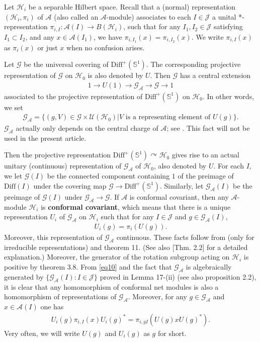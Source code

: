 \documentclass[12pt,a4paper]{article}
\theoremstyle{definition}
\theoremstyle{plain}
\newcommand{\mc}{\mathcal}
\newcommand{\Diffp}{\mathrm{Diff}^+}
\newcommand{\Diff}{\mathrm{Diff}}
\newcommand{\GA}{\mathscr G_{\mathcal A}}
\newcommand{\scr}{\mathscr}
\newcommand{\mbb}{\mathbb}
\numberwithin{equation}{section}
\begin{document}
Let $\mathcal H_i$ be a separable Hilbert space. Recall that a (normal) representation $(\mathcal H_i,\pi_i)$ of $\mathcal A$ (also called an $\mc A$-module) associates to each $I\in\mathcal J$ a unital *-representation $\pi_{i,I}:\mathcal A(I)\rightarrow B(\mathcal H_i)$, such that for any $I_1,I_2\in\mathcal J$ satisfying $I_1\subset I_2$, and any $x\in\mathcal A(I_1)$, we have $\pi_{i,I_1}(x)=\pi_{i,I_2}(x)$. We write $\pi_{i,I}(x)$  as $\pi_i(x)$ or just $x$ when no confusion arises. 



Let $\scr G$ be the universal covering of $\Diffp(\mbb S^1)$. The corresponding projective representation of $\scr G$ on $\mc H_0$ is also denoted by $U$. Then $\scr G$ has a central extension
\begin{align*}
1\rightarrow U(1)\rightarrow\GA\rightarrow \scr G\rightarrow 1
\end{align*}
associated to the projective representation of $\Diffp(\mbb S^1)$ on $\mc H_0$. In other words, we set
\begin{align*}
\GA=\{(g,V)\in\mathscr G\times \mathcal U(\mathcal H_0)| V \textrm{ is a representing element of } U(g) \}.
\end{align*}
$\scr G_{\mc A}$ actually only depends on the central charge of $\scr A$; see \cite{Gui21a}. This fact will not be used in the present article.

Then the projective representation $\Diffp(\mbb S^1)\curvearrowright\mc H_0$ gives rise to an actual unitary (continuous) representation of $\GA$ of $\mc H_0$, also denoted by $U$. For each $I$, we let $\scr G(I)$ be the connected component containing $1$ of the preimage of $\Diff(I)$ under the covering map $\scr G\rightarrow \Diffp(\mbb S^1)$. Similarly, let $\GA(I)$ be the preimage of $\scr G(I)$ under $\GA\rightarrow\scr G$. If $\mc A$ is conformal covariant, then any $\mc A$-module $\mc H_i$ is \textbf{conformal covariant}, which means that there is a unique representation $U_i$ of $\GA$ on $\mc H_i$ such that for any $I\in\mc J$ and $g\in\GA(I)$,
\begin{align}
U_i(g)=\pi_i(U(g)).\label{eq10}
\end{align}
Moreover, this representation of $\scr G_{\mc A}$ continuous. These facts follow from \cite{AFK04} (only for irreducible representations) and \cite{Hen19} theorem 11. (See also \cite{Gui21a}[Thm. 2.2] for a detailed explanation.) Moreover, the generator of the rotation subgroup acting on $\mc H_i$ is positive by \cite{Wei06} theorem 3.8. From \eqref{eq10} and the fact that $\GA$ is algebraically generated by  $\{\GA(I):I\in\mc J \}$ proved in \cite{Hen19} Lemma 17-(ii) (see also \cite{Gui21a} proposition 2.2), it is clear that any homomorphism of conformal net modules is also a homomorphism of representations of $\GA$. Moreover, for any $g\in\GA$ and $x\in\mc A(I)$ one has
\begin{align}
U_i(g)\pi_{i,I}(x)U_i(g)^*=\pi_{i,gI}(U(g)xU(g)^*).\label{eq20}
\end{align}
Very often, we will write $U(g)$ and $U_i(g)$ as $g$ for short.
\end{document}
